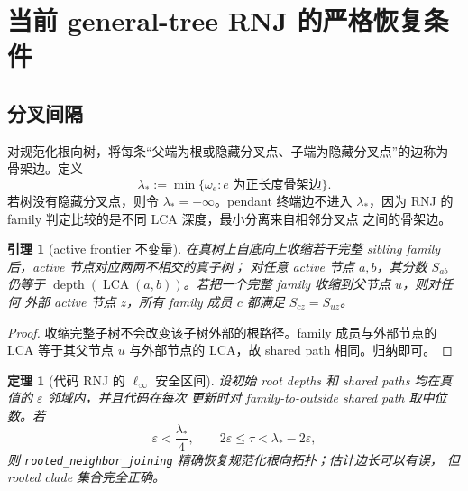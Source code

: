 \documentclass[UTF8,11pt]{ctexart}
\newtheorem{theorem}[definition]{定理}
\newtheorem{lemma}[definition]{引理}
\newcommand{\lca}{\operatorname{LCA}}
\begin{document}
\section{当前 general-tree RNJ 的严格恢复条件}

\subsection{分叉间隔}

对规范化根向树，将每条“父端为根或隐藏分叉点、子端为隐藏分叉点”的边称为
骨架边。定义
\begin{equation}
 \lambda_*:=\min\{\omega_e:e\text{ 为正长度骨架边}\}.
 \label{eq:skeleton-margin}
\end{equation}
若树没有隐藏分叉点，则令 $\lambda_*=+\infty$。pendant 终端边不进入
$\lambda_*$，因为 RNJ 的 family 判定比较的是不同 LCA 深度，最小分离来自相邻分叉点
之间的骨架边。

\begin{lemma}[active frontier 不变量]
\label{lem:active-frontier}
在真树上自底向上收缩若干完整 sibling family 后，active 节点对应两两不相交的真子树；
对任意 active 节点 $a,b$，其分数 $S_{ab}$ 仍等于
$\operatorname{depth}(\lca(a,b))$。若把一个完整 family 收缩到父节点 $u$，则对任何
外部 active 节点 $z$，所有 family 成员 $c$ 都满足
$S_{cz}=S_{uz}$。
\end{lemma}

\begin{proof}
收缩完整子树不会改变该子树外部的根路径。family 成员与外部节点的 LCA 等于其父节点
$u$ 与外部节点的 LCA，故 shared path 相同。归纳即可。
\end{proof}

\begin{theorem}[代码 RNJ 的 $\ell_\infty$ 安全区间]
\label{thm:rnj-robust}
设初始 root depths 和 shared paths 均在真值的 $\varepsilon$ 邻域内，并且代码在每次
更新时对 family-to-outside shared path 取中位数。若
\begin{equation}
 \varepsilon<\frac{\lambda_*}{4},
 \qquad
 2\varepsilon\le\tau<\lambda_*-2\varepsilon,
 \label{eq:rnj-safe-interval}
\end{equation}
则 \texttt{rooted\_neighbor\_joining} 精确恢复规范化根向拓扑；估计边长可以有误，
但 rooted clade 集合完全正确。
\end{theorem}
\end{document}
